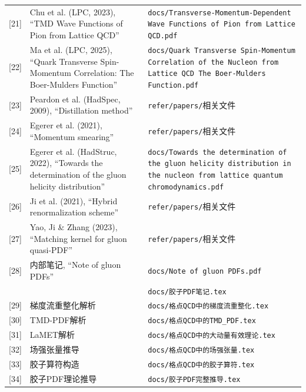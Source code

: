 \documentclass[12pt,a4paper]{ctexart}
\theoremstyle{definition}
\begin{document}
\begin{longtable}{lp{6cm}p{5cm}}
[21] & Chu et al. (LPC, 2023), ``TMD Wave Functions of Pion from Lattice QCD'' & \texttt{docs/Transverse-Momentum-Dependent Wave Functions of Pion from Lattice QCD.pdf} \\

[22] & Ma et al. (LPC, 2025), ``Quark Transverse Spin-Momentum Correlation: The Boer-Mulders Function'' & \texttt{docs/Quark Transverse Spin-Momentum Correlation of the Nucleon from Lattice QCD The Boer-Mulders Function.pdf} \\

[23] & Peardon et al. (HadSpec, 2009), ``Distillation method'' & \texttt{refer/papers/}相关文件 \\

[24] & Egerer et al. (2021), ``Momentum smearing'' & \texttt{refer/papers/}相关文件 \\

[25] & Egerer et al. (HadStruc, 2022), ``Towards the determination of the gluon helicity distribution'' & \texttt{docs/Towards the determination of the gluon helicity distribution in the nucleon from lattice quantum chromodynamics.pdf} \\

[26] & Ji et al. (2021), ``Hybrid renormalization scheme'' & \texttt{refer/papers/}相关文件 \\

[27] & Yao, Ji \& Zhang (2023), ``Matching kernel for gluon quasi-PDF'' & \texttt{refer/papers/}相关文件 \\

[28] & 内部笔记, ``Note of gluon PDFs'' & \texttt{docs/Note of gluon PDFs.pdf} \\
    & & \texttt{docs/胶子PDF笔记.tex} \\

[29] & 梯度流重整化解析 & \texttt{docs/格点QCD中的梯度流重整化.tex} \\

[30] & TMD-PDF解析 & \texttt{docs/格点QCD中的TMD\_PDF.tex} \\

[31] & LaMET解析 & \texttt{docs/格点QCD中的大动量有效理论.tex} \\

[32] & 场强张量推导 & \texttt{docs/格点QCD中的场强张量.tex} \\

[33] & 胶子算符构造 & \texttt{docs/格点QCD中的胶子算符.tex} \\

[34] & 胶子PDF理论推导 & \texttt{docs/胶子PDF完整推导.tex} \\


\end{longtable}
\end{document}
